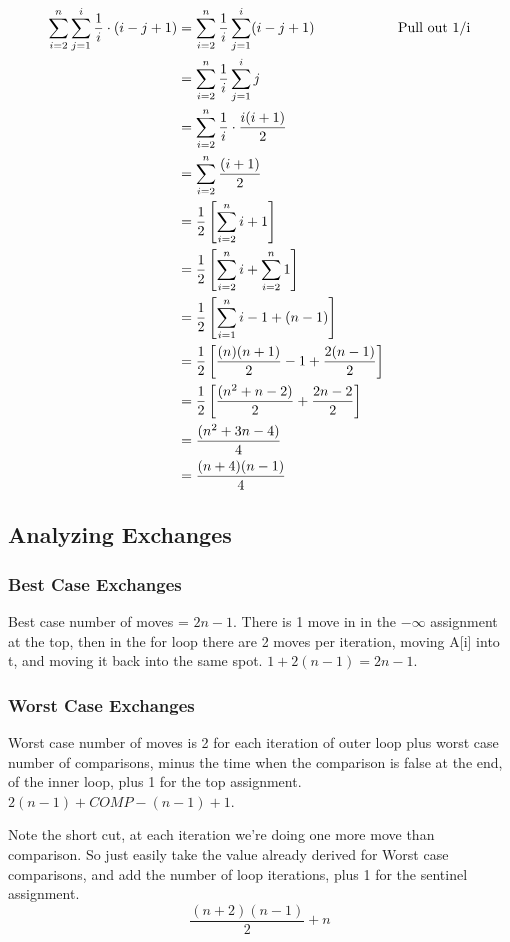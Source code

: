 \documentclass[english, 10pt]{article}
\begin{document}
\begin{align*}
    \sum_{i=2}^{n} \sum_{j=1}^{i} \frac{1}{i} \cdot (i-j+1) &= \sum_{i=2}^{n} \frac{1}{i} \sum_{j=1}^{i} (i-j+1)  &  \text{Pull out 1/i} \\
 &= \sum_{i=2}^{n}\frac{1}{i}\sum_{j=1}^{i} j \\
 &= \sum_{i=2}^{n}\frac{1}{i}\cdot\frac{i(i+1)}{2} \\
 &= \sum_{i=2}^{n}\frac{(i+1)}{2} \\
 &= \frac{1}{2}\left[ \sum_{i=2}^{n}i+1\right] \\
 &= \frac{1}{2}\left[ \sum_{i=2}^{n}i+ \sum_{i=2}^{n}1\right] \\
 &= \frac{1}{2}\left[ \sum_{i=1}^{n}i -1 + (n-1) \right] \\
 &= \frac{1}{2}\left[ \frac{(n)(n+1)}{2} -1 + \frac{2(n-1)}{2} \right] \\
 &= \frac{1}{2}\left[ \frac{(n^2+n-2)}{2} + \frac{2n-2}{2} \right] \\
 &= \frac{(n^2+3n-4)}{4}  \\
 &= \frac{(n+4) (n-1)}{4}
\end{align*}


\subsection{Analyzing Exchanges}

\subsubsection{Best Case Exchanges}

Best case number of moves = $2n-1$. There is 1 move in in the $-\infty$
assignment at the top, then in the for loop there are 2 moves per iteration,
moving A[i] into t, and moving it back into the same spot. $1 + 2(n-1) = 2n
-1$.

\subsubsection{Worst Case Exchanges}

Worst case number of moves is 2 for each iteration of outer loop plus worst
case number of comparisons, minus the time when the comparison is false at the
end, of the inner loop, plus 1 for the top assignment. $2(n-1) + COMP - (n-1)
+1 $.

Note the short cut, at each iteration we're doing one more move than
comparison. So just easily take the value already derived for Worst case
comparisons, and add the number of loop iterations, plus 1 for the sentinel
assignment.  $$\frac{(n+2)(n-1)}{2} +n $$
\end{document}
